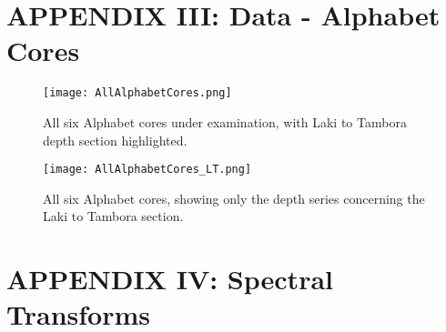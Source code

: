 \documentclass[../../CompleteThesis/Complete_1stDraft.tex]{subfiles}
\begin{document}
	
	
	\newpage
	\section[Appendix III]{APPENDIX III: Data - Alphabet Cores}
	\label{AppIII:Data_Alphabet}
	\begin{figure}[h]
		\centering
		\texttt{[image: AllAlphabetCores.png]}
		\caption[]{All six Alphabet cores under examination, with Laki to Tambora depth section highlighted.}
		\label{fig:AllAlphabetCores}
	\end{figure}
	
	\begin{figure}[H]
		\centering
		\texttt{[image: AllAlphabetCores\_LT.png]}
		\caption[]{All six Alphabet cores, showing only the depth series concerning the Laki to Tambora section.}
		\label{fig:AllAlphabetCores_LT}
	\end{figure}
	\newpage
	
	
	\newpage
	\section[Appendix IV]{APPENDIX IV: Spectral Transforms}
	\label{AppIV:SpectralTransforms}		
\end{document}
